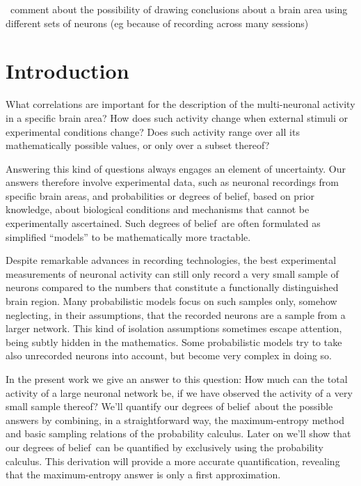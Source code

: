 \documentclass[\ifafour a4paper,12pt,\else a5paper,10pt,\fi%
onecolumn,oneside,article,%
british%
]{memoir}
\theoremstyle{remark}
\theoremstyle{innote}
\renewcommand*{\|}[1][]{\nonscript\,#1\vert\nonscript\;\mathopen{}}
\newcommand*{\puzzle}{{\fontencoding{U}\fontfamily{fontawesometwo}\selectfont\symbol{225}}}
\newcommand{\mynote}[1]{ {\color{notecolour}\puzzle\ #1}}
\newcommand*{\dobs}{degrees of belief}
\begin{document}

\mynote{comment about the possibility of drawing conclusions about a brain
  area using different sets of neurons (eg because of recording across many
  sessions)}


\section{Introduction}
\label{sec:intro}

What correlations are important for the description of the multi-neuronal
activity in a specific brain area? How does such activity change when
external stimuli or experimental conditions change? Does such activity
range over all its mathematically possible values, or only over a
subset thereof? 

Answering this kind of questions always engages an element of uncertainty.
Our answers therefore involve experimental data, such as neuronal
recordings from specific brain areas, and probabilities or \dobs, based on
prior knowledge, about biological conditions and mechanisms that cannot be
experimentally ascertained. Such \dobs\ are often formulated as simplified
\enquote{models} to be mathematically more tractable.

Despite remarkable advances in recording technologies, the best
experimental measurements of neuronal activity can still only record a very
small sample of neurons compared to the numbers that constitute a
functionally distinguished brain region. Many probabilistic models focus on
such samples only, somehow neglecting, in their assumptions, that the
recorded neurons are a sample from a larger network. This kind of isolation
assumptions sometimes escape attention, being subtly hidden in the
mathematics. Some probabilistic models try to take also unrecorded neurons
into account, but become very complex in doing so.

In the present work we give an answer to this question: How much can the
total activity of a large neuronal network be, if we have observed the
activity of a very small sample thereof? We'll quantify our \dobs\ about
the possible answers by combining, in a straightforward way, the
maximum-entropy method and basic sampling relations of the probability
calculus. Later on we'll show that our \dobs\ can be quantified by
exclusively using the probability calculus. This derivation will provide a
more accurate quantification, revealing that the maximum-entropy answer is
only a first approximation.
\end{document}
